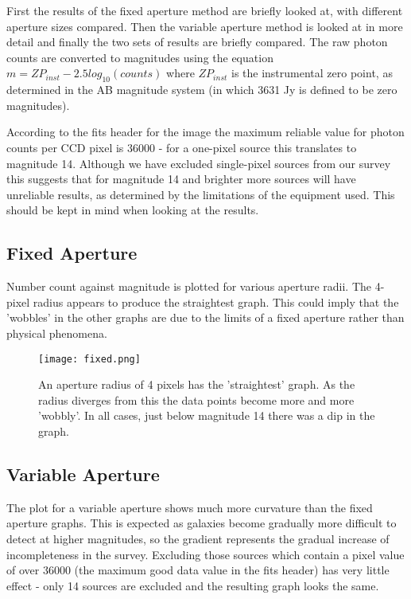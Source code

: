 \documentclass[a4paper,11pt,twoside]{article}
\begin{document}
First the results of the fixed aperture method are briefly looked at, 
with different aperture sizes compared. Then the variable aperture 
method is looked at in more detail and finally the two sets of 
results are briefly compared.
The raw photon counts are converted to magnitudes using 
the equation \(m = ZP_{inst} - 2.5log_{10}(counts)\) 
where \(ZP_{inst}\) is the instrumental zero point, as determined 
in the AB magnitude system (in which 3631 Jy is defined to be 
zero magnitudes). 

According to the fits header for the image 
the maximum reliable value for photon counts per CCD pixel is 
36000 - for a one-pixel source this translates to magnitude 
14. Although we have excluded single-pixel sources from our survey 
this suggests that for magnitude 14 and brighter more sources 
will have unreliable results, as determined by the limitations 
of the equipment used. This should be kept in mind when looking 
at the results.

\subsection{Fixed Aperture}

Number count against magnitude is plotted for various aperture 
radii. The 4-pixel radius appears to produce the straightest 
graph. This could imply that the 'wobbles' in the other graphs 
are due to the limits of a fixed aperture rather than physical phenomena. 

\begin{figure}[htb]
  \centering
  \texttt{[image: fixed.png]}
  \caption{An aperture radius of 4 pixels has the 'straightest' graph. 
As the radius diverges from this the data points become more and 
more 'wobbly'. In all cases, just below magnitude 14 there was a 
dip in the graph.} 
  \label{fig:fixed}
\end{figure}

\subsection{Variable Aperture}

The plot for a variable aperture shows much more curvature 
than the fixed aperture graphs. This is expected as galaxies 
become gradually more difficult to detect at higher magnitudes, 
so the gradient represents the gradual increase of 
incompleteness in the survey. Excluding those sources which 
contain a pixel value of over 36000 (the maximum good data 
value in the fits header) has very little 
effect - only 14 sources are excluded and the resulting graph 
looks the same.
\end{document}
